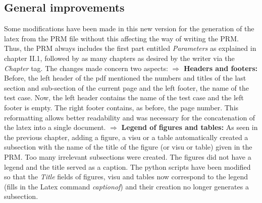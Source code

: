 \subsection*{General improvements}
Some modifications have been made in this new version for the generation of the latex from the PRM file without this affecting the way of writing the PRM.
Thus, the PRM always includes the first part entitled \textit{Parameters} as explained in chapter II.1, followed by as many chapters as desired by the writer via the \textit{Chapter} tag.\newline
The changes made concern two aspects:\vspace*{0.2cm}\newline
\hspace*{0.5cm}$\Rightarrow$ \textbf{Headers and footers:}\vspace*{0.15cm}\newline
Before, the left header of the pdf mentioned the numbers and titles of the last section and sub-section of the current page and the left footer, the name of the test case.\newline
Now, the left header contains the name of the test case and the left footer is empty. The right footer contains, as before, the page number. This reformatting allows better readability and was necessary for the concatenation of the latex into a single document.\vspace*{0.2cm}\newline
\hspace*{0.5cm}$\Rightarrow$ \textbf{Legend of figures and tables:}\vspace*{0.15cm}\newline
As seen in the previous chapter, adding a figure, a visu or a table automatically created a subsection with the name of the title of the figure (or visu or table) given in the PRM. Too many irrelevant subsections were created. The figures did not have a legend and
the title served as a caption.\newline
The python scripts have been modified so that the \textit{Title} fields of figures, visu and tables now correspond to the legend (fills in the Latex command \textit{captionof}) and their creation no longer generates a subsection.\newline

